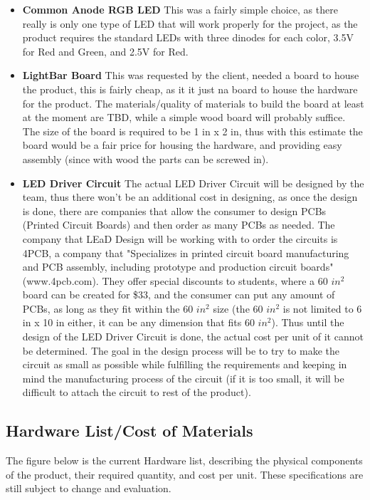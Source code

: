 \documentclass[12pt]{article}
\begin{document}
{{{{\begin{itemize}
				\item \textbf{Common Anode RGB LED}
				This was a fairly simple choice, as there really is only one type of LED that will work properly for the project, as the product requires the standard LEDs with three dinodes for each color, 3.5V for Red and Green, and 2.5V for Red.
				\item \textbf{LightBar Board}
				This was requested by the client, needed a board to house the product, this is fairly cheap, as it it just na board to house the hardware for the product. The materials/quality of materials to build the board at least at the moment are TBD, while a simple wood board will probably suffice. The size of the board is required to be 1 in x 2 in, thus with this estimate the board would be a fair price for housing the hardware, and providing easy assembly (since with wood the parts can be screwed in).	
				\item \textbf{LED Driver Circuit}
				The actual LED Driver Circuit will be designed by the team, thus there won't be an additional cost in designing, as once the design is done, there are companies that allow the consumer to design PCBs (Printed Circuit Boards) and then order as many PCBs as needed. The company that LEaD Design will be working with to order the circuits is 4PCB, a company that "Specializes in printed circuit board manufacturing and PCB assembly, including prototype and production circuit boards" (www.4pcb.com). They offer special discounts to students, where a 60 $in^2$ board can be created for \$33, and the consumer can put any amount of PCBs, as long as they fit within the 60 $in^2$ size (the 60 $in^2$ is not limited to 6 in x 10 in either, it can be any dimension that fits 60 $in^2$). Thus until the design of the LED Driver Circuit is done, the actual cost per unit of it cannot be determined. The goal in the design process will be to try to make the circuit as small as possible while fulfilling the requirements and keeping in mind the manufacturing process of the circuit (if it is too small, it will be difficult to attach the circuit to rest of the product).
			\end{itemize}
			
			\subsection{Hardware List/Cost of Materials}
			The figure below is the current Hardware list, describing the physical components of the product, their required quantity, and cost per unit. These specifications are still subject to change and evaluation.
			
}}}}
\end{document}

